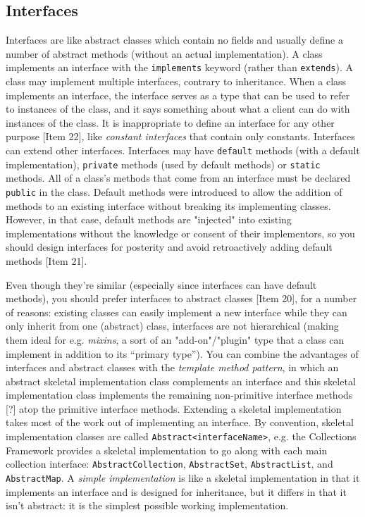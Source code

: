 \documentclass[8pt, table, xcdraw]{article}%
\begin{document}
\subsection{Interfaces}

Interfaces are like abstract classes which contain no fields and usually define a number of abstract methods (without an actual implementation). A class implements an interface with the \lstinline{implements} keyword (rather than \lstinline{extends}). A class may implement multiple interfaces, contrary to inheritance. When a class implements an interface, the interface serves as a type that can be used to refer to instances of the class, and it says something about what a client can do with instances of the class. It is inappropriate to define an interface for any other purpose [Item 22], like \emph{constant interfaces} that contain only constants. Interfaces can extend other interfaces. Interfaces may have \lstinline{default} methods (with a default implementation), \lstinline{private} methods (used by default methods) or \lstinline{static} methods. All of a class's methods that come from an interface must be declared \lstinline{public} in the class. Default methods were introduced to allow the addition of methods to an existing interface without breaking its implementing classes. However, in that case, default methods are "injected" into existing implementations without the knowledge or consent of their implementors, so you should design interfaces for posterity and avoid retroactively adding default methods [Item 21].

Even though they're similar (especially since interfaces can have default methods), you should prefer interfaces to abstract classes [Item 20], for a number of reasons: existing classes can easily implement a new interface while they can only inherit from one (abstract) class, interfaces are not hierarchical (making them ideal for e.g. \emph{mixins}, a sort of an "add-on"/"plugin" type that a class can implement in addition to its “primary type”). You can combine the advantages of interfaces and abstract classes with the \emph{template method pattern}, in which an abstract skeletal implementation class complements an interface and this skeletal implementation class implements the remaining non-primitive interface methods [?] atop the primitive interface methods. Extending a skeletal implementation takes most of the work out of implementing an interface. By convention, skeletal implementation classes are called \lstinline{Abstract<interfaceName>}, e.g. the Collections Framework provides a skeletal implementation to go along with each main collection interface: \lstinline{AbstractCollection}, \lstinline{AbstractSet}, \lstinline{AbstractList}, and \lstinline{AbstractMap}. A \emph{simple implementation} is like a skeletal implementation in that it implements an interface and is designed for inheritance, but it differs in that it isn't abstract: it is the simplest possible working implementation.
\end{document}
